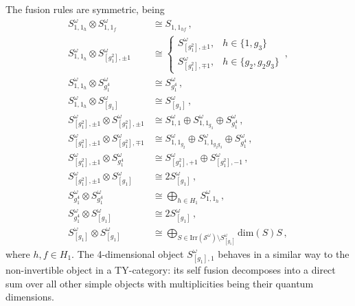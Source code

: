 \documentclass[aps,twocolumn,prx,floatfix,preprintnumbers, nofootinbib,10pt]{revtex4-2}
\numberwithin{equation}{section}
\theoremstyle{definition}
\newcommand{\cS}{\mathcal{S}}
\renewcommand{\dim}{\text{dim}}
\begin{document}
The fusion rules are symmetric, being
\begin{equation}
    \begin{split}
        S^\omega_{1,1_h} \otimes S^\omega_{1,1_f} & \cong S_{1,1_{hf}}\,, \\
        S^\omega_{1,1_h} \otimes S^{\omega}_{[g_1^2], \pm 1} & \cong \begin{cases}
            S^{\omega}_{[g_1^2], \pm 1}, & h \in \{1, g_3\} \\
            S^{\omega}_{[g_1^2], \mp 1}, & h \in \{ g_2, g_2g_3\}
        \end{cases}\,,\\
        S^\omega_{1,1_h} \otimes S^\omega_{g_1^4} & \cong S^\omega_{g_1^4} \,, \\
        S^\omega_{1,1_h} \otimes S^\omega_{[g_1]} & \cong S^\omega_{[g_1]}\,, \\
        S^{\omega}_{[g_1^2], \pm 1} \otimes S^{\omega}_{[g_1^2], \pm 1} & \cong S^\omega_{1,1} \oplus S^\omega_{1,1_{g_3}} \oplus S^\omega_{g_1^4}\,,\\
        S^{\omega}_{[g_1^2], \pm 1} \otimes S^{\omega}_{[g_1^2], \mp 1} & \cong S^\omega_{1,1_{g_2}} \oplus S^\omega_{1,1_{g_2 g_3}} \oplus S^\omega_{g_1^4}\,,\\
        S^{\omega}_{[g_1^2], \pm 1} \otimes S^\omega_{g_1^4} & \cong S^{\omega}_{[g_1^2], + 1} \oplus S^{\omega}_{[g_1^2], - 1}\,, \\
        S^{\omega}_{[g_1^2], \pm 1} \otimes S^\omega_{[g_1]} & \cong 2 S^\omega_{[g_1]}\,,\\
        S^\omega_{g_1^4} \otimes S^\omega_{g_1^4} & \cong \bigoplus_{h\in H_1} S^\omega_{1,1_h}\,,\\
        S^\omega_{g_1^4} \otimes S^\omega_{[g_1]} & \cong 2 S^\omega_{[g_1]} \,,\\
        S^\omega_{[g_1]} \otimes S^\omega_{[g_1]} & \cong \bigoplus_{S \in \text{Irr}(\cS^\omega)\setminus S^\omega_{[g_1]}} \dim(S) S\,,
    \end{split}
\end{equation}
where $h,f\in H_1$. The 4-dimensional object $S^\omega_{[g_1],1}$ behaves in a similar way to the non-invertible object in a TY-category: its self fusion decomposes into a direct sum over all other simple objects with multiplicities being their quantum dimensions.
\end{document}
